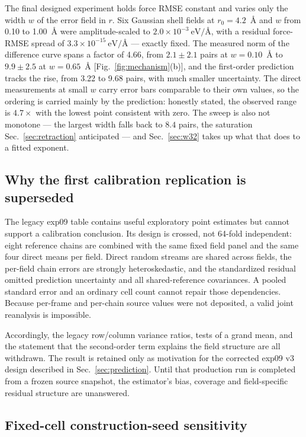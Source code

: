 \documentclass[aip,jcp,reprint,amsmath,amssymb,floatfix]{revtex4-2}
\newcommand{\eVA}{\ensuremath{\mathrm{eV}/\text{\AA}}}
\begin{document}
The final designed experiment holds force RMSE constant and varies only the
width $w$ of the error field in $r$. Six Gaussian shell fields at
$r_0 = 4.2$~\AA{} and $w$ from 0.10 to 1.00~\AA{} were amplitude-scaled to
$2.0\times10^{-3}~\eVA$, with a residual force-RMSE spread of
$3.3\times10^{-15}~\eVA$ --- exactly fixed.
The measured norm of the difference curve spans a factor of 4.66, from
$2.1 \pm 2.1$ pairs at $w = 0.10$~\AA{} to $9.9 \pm 2.5$ at
$w = 0.65$~\AA{} [Fig.~\ref{fig:mechanism}(b)], and the first-order
prediction tracks the rise, from 3.22 to 9.68 pairs, with
much smaller uncertainty. The direct measurements at small $w$ carry
error bars comparable to their own values, so the ordering is
carried mainly by the prediction: honestly stated, the observed range is
$4.7\times$ with the lowest point consistent with zero. The sweep is also not monotone --- the largest width falls
back to $8.4$ pairs, the saturation Sec.~\ref{sec:retraction}
anticipated --- and Sec.~\ref{sec:w32} takes up what that does to a fitted
exponent.

\subsection{Why the first calibration replication is superseded}
\label{sec:calibration}

The legacy exp09 table contains useful exploratory point estimates but cannot
support a calibration conclusion. Its design is crossed, not 64-fold
independent: eight reference chains are combined with the same fixed field panel
and the same four direct means per field. Direct random streams are shared across
fields, the per-field chain errors are strongly heteroskedastic, and the
standardized residual omitted prediction uncertainty and all shared-reference
covariances. A pooled standard error and an ordinary cell count cannot repair
those dependencies. Because per-frame and per-chain source values were not
deposited, a valid joint reanalysis is impossible.

Accordingly, the legacy row/column variance ratios, tests of a grand mean, and
the statement that the second-order term explains the field structure are all
withdrawn. The result is retained only as motivation for the corrected exp09 v3
design described in Sec.~\ref{sec:prediction}. Until that production run is
completed from a frozen source snapshot, the estimator's bias, coverage and
field-specific residual structure are unanswered.

\subsection{Fixed-cell construction-seed sensitivity}
\label{sec:replication}
\end{document}
